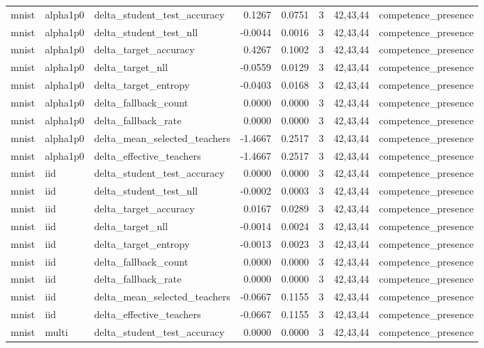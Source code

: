 \begin{tabular}{lllrrrll}
mnist & alpha1p0 & delta\_student\_test\_accuracy & 0.1267 & 0.0751 & 3 & 42,43,44 & competence\_presence \\
mnist & alpha1p0 & delta\_student\_test\_nll & -0.0044 & 0.0016 & 3 & 42,43,44 & competence\_presence \\
mnist & alpha1p0 & delta\_target\_accuracy & 0.4267 & 0.1002 & 3 & 42,43,44 & competence\_presence \\
mnist & alpha1p0 & delta\_target\_nll & -0.0559 & 0.0129 & 3 & 42,43,44 & competence\_presence \\
mnist & alpha1p0 & delta\_target\_entropy & -0.0403 & 0.0168 & 3 & 42,43,44 & competence\_presence \\
mnist & alpha1p0 & delta\_fallback\_count & 0.0000 & 0.0000 & 3 & 42,43,44 & competence\_presence \\
mnist & alpha1p0 & delta\_fallback\_rate & 0.0000 & 0.0000 & 3 & 42,43,44 & competence\_presence \\
mnist & alpha1p0 & delta\_mean\_selected\_teachers & -1.4667 & 0.2517 & 3 & 42,43,44 & competence\_presence \\
mnist & alpha1p0 & delta\_effective\_teachers & -1.4667 & 0.2517 & 3 & 42,43,44 & competence\_presence \\
mnist & iid & delta\_student\_test\_accuracy & 0.0000 & 0.0000 & 3 & 42,43,44 & competence\_presence \\
mnist & iid & delta\_student\_test\_nll & -0.0002 & 0.0003 & 3 & 42,43,44 & competence\_presence \\
mnist & iid & delta\_target\_accuracy & 0.0167 & 0.0289 & 3 & 42,43,44 & competence\_presence \\
mnist & iid & delta\_target\_nll & -0.0014 & 0.0024 & 3 & 42,43,44 & competence\_presence \\
mnist & iid & delta\_target\_entropy & -0.0013 & 0.0023 & 3 & 42,43,44 & competence\_presence \\
mnist & iid & delta\_fallback\_count & 0.0000 & 0.0000 & 3 & 42,43,44 & competence\_presence \\
mnist & iid & delta\_fallback\_rate & 0.0000 & 0.0000 & 3 & 42,43,44 & competence\_presence \\
mnist & iid & delta\_mean\_selected\_teachers & -0.0667 & 0.1155 & 3 & 42,43,44 & competence\_presence \\
mnist & iid & delta\_effective\_teachers & -0.0667 & 0.1155 & 3 & 42,43,44 & competence\_presence \\
mnist & multi & delta\_student\_test\_accuracy & 0.0000 & 0.0000 & 3 & 42,43,44 & competence\_presence \\

\end{tabular}

